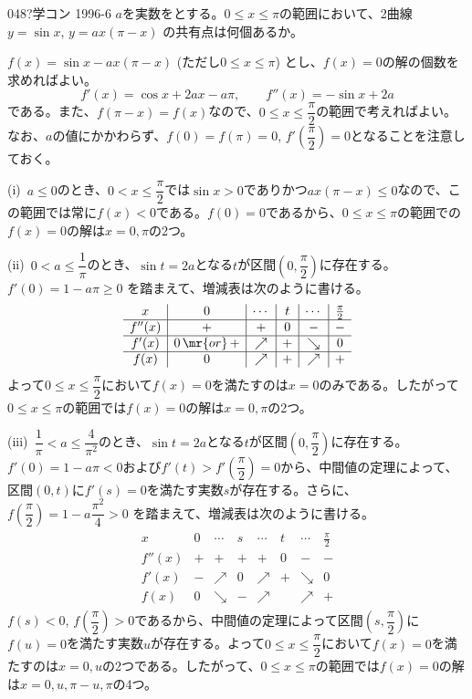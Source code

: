 \begin{thm}{048}{\hosi ?}{学コン 1996-6}
 $a$を実数をとする。$0\le x \le \pi$の範囲において、2曲線 $y=\sin x$, $y=ax(\pi-x)$ の共有点は何個あるか。
\end{thm}

$f(x)=\sin x -ax(\pi-x)$ (ただし$0\le x\le \pi$) とし、$f(x)=0$の解の個数を求めればよい。
\[ f'(x)=\cos x+2ax-a\pi, \qquad f''(x)=-\sin x + 2a \]
である。また、$f(\pi-x)=f(x)$なので、$0\le x\le \dfrac{\pi}{2}$の範囲で考えればよい。なお、$a$の値にかかわらず、$f(0)=f(\pi)=0$, $f'\left(\dfrac{\pi}{2}\right)=0$となることを注意しておく。

(i)~$a\le 0$のとき、$0< x\le \dfrac{\pi}{2}$では$\sin x>0$でありかつ$ax(\pi-x)\le 0$なので、この範囲では常に$f(x)<0$である。$f(0)=0$であるから、$0\le x\le \pi$の範囲での$f(x)=0$の解は$x=0, \pi$の2つ。

(ii)~$0<a\le\dfrac{1}{\pi}$のとき、$\sin t=2a$となる$t$が区間$\left(0, \dfrac{\pi}{2} \right)$に存在する。$f'(0)=1-a\pi\ge 0$ を踏まえて、増減表は次のように書ける。
\begin{align*}
 \begin{array}{c|c|c|c|c|c}
  x & 0 & \cdots & t & \cdots & \frac{\pi}{2} \\ \hline
  f''(x) & + & + & 0 & - & - \\ \hline
  f'(x) & 0 \,\mr{or}\, + & \nearrow & + & \searrow & 0 \\ \hline
  f(x) & 0 & \nearrow & + & \nearrow & + 
 \end{array}
\end{align*}
よって$0\le x\le \dfrac{\pi}{2}$において$f(x)=0$を満たすのは$x=0$のみである。したがって$0\le x\le \pi$の範囲では$f(x)=0$の解は$x=0, \pi$の2つ。

(iii)~$\dfrac{1}{\pi}<a\le\dfrac{4}{\pi^2}$のとき、$\sin t=2a$となる$t$が区間$\left(0, \dfrac{\pi}{2} \right)$に存在する。$f'(0)=1-a\pi< 0$および$f'(t)>f'\left(\dfrac{\pi}{2}\right)=0$から、中間値の定理によって、区間$(0,t)$に$f'(s)=0$を満たす実数$s$が存在する。さらに、$f\left(\dfrac{\pi}{2}\right)=1-a\dfrac{\pi^2}{4}>0$ を踏まえて、増減表は次のように書ける。
\begin{align*}
 \begin{array}{c|c|c|c|c|c|c|c}
  x & 0 & \cdots & s & \cdots & t & \cdots & \frac{\pi}{2} \\ \hline
  f''(x) & + & + & + & + & 0 & - & - \\ \hline
  f'(x) & - & \nearrow & 0 & \nearrow &  + & \searrow & 0 \\ \hline
  f(x) & 0 & \searrow & - & \nearrow & & \nearrow & +
 \end{array}
\end{align*}
$f(s)<0$, $f\left(\dfrac{\pi}{2}\right)>0$であるから、中間値の定理によって区間$\left(s, \dfrac{\pi}{2}\right)$に$f(u)=0$を満たす実数$u$が存在する。よって$0\le x\le\dfrac{\pi}{2}$において$f(x)=0$を満たすのは$x=0, u$の2つである。したがって、$0\le x\le \pi$の範囲では$f(x)=0$の解は$x=0, u, \pi-u, \pi$の4つ。

